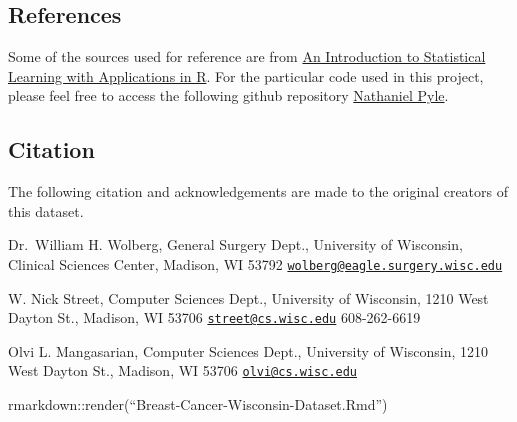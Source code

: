\documentclass[
]{article}
\begin{document}
\subsection{References}\label{references}

Some of the sources used for reference are from
\href{https://www.statlearning.com/}{An Introduction to Statistical
Learning with Applications in R}. For the particular code used in this
project, please feel free to access the following github repository
\href{https://github.com/NathanielPyle/NathanielPyle.github.io}{Nathaniel
Pyle}.

\subsection{Citation}\label{citation}

The following citation and acknowledgements are made to the original
creators of this dataset.

Dr.~William H. Wolberg, General Surgery Dept., University of Wisconsin,
Clinical Sciences Center, Madison, WI 53792
\href{mailto:wolberg@eagle.surgery.wisc.edu}{\nolinkurl{wolberg@eagle.surgery.wisc.edu}}

W. Nick Street, Computer Sciences Dept., University of Wisconsin, 1210
West Dayton St., Madison, WI 53706
\href{mailto:street@cs.wisc.edu}{\nolinkurl{street@cs.wisc.edu}}
608-262-6619

Olvi L. Mangasarian, Computer Sciences Dept., University of Wisconsin,
1210 West Dayton St., Madison, WI 53706
\href{mailto:olvi@cs.wisc.edu}{\nolinkurl{olvi@cs.wisc.edu}}

rmarkdown::render(``Breast-Cancer-Wisconsin-Dataset.Rmd'')
\end{document}
